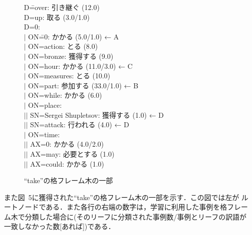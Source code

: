\begin{figure}
  \begin{center}
\vspace*{-4mm}
    \begin{minipage}{80mm}
      \large
      \def\baselinestretch{}
      \normalsize
      \begin{tabbing}
        D\bras{}\==over: 引き継ぐ (12.0)\\
        D\bras{}=up: 取る (3.0/1.0)\\
        D\bras{}=0:\\
        $|$\> ON\bras{}\==0: かかる (5.0/1.0) ← A\\
        $|$\> ON\bras{}=action: とる (8.0)\\
        $|$\> ON\bras{}=bronze: 獲得する (9.0)\\
        $|$\> ON\bras{}=hour: かかる (11.0/3.0) ← C\\
        $|$\> ON\bras{}=measures: とる (10.0)\\
        $|$\> ON\bras{}=part: 参加する (33.0/1.0) ← B\\
        $|$\> ON\bras{}=while: かかる (6.0)\\
        $|$\> ON\bras{}=place:\\
        $|$\>\>$|$ SN\bras{}=Sergei Shupletsov: 獲得する (1.0) ← D\\
        $|$\>\>$|$ SN\bras{}=attack: 行われる (4.0) ← D\\
        $|$\> ON\bras{}=time:\\
        $|$\>\>$|$ AX\bras{}=0: かかる (4.0/2.0)\\
        $|$\>\>$|$ AX\bras{}=may: 必要とする (1.0)\\
        $|$\>\>$|$ AX\bras{}=could: かかる (1.0)
      \end{tabbing}
    \end{minipage}
  \end{center}
  \caption{``take''の格フレーム木の一部}
\end{figure}

また図~5に獲得された``take''の格フレーム木の一部を示す．この図では左が
ルートノードである．また各行の右端の数字は，学習に利用した事例を格フレー
ム木で分類した場合に(そのリーフに分類された事例数/事例とリーフの訳語が
一致しなかった数[あれば])である．

